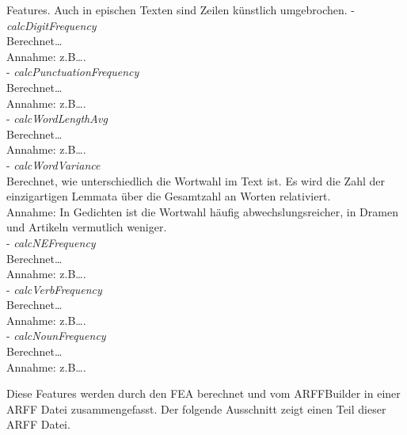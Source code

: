 \documentclass[]{article}
\begin{document}
Features. Auch in epischen Texten sind Zeilen künstlich umgebrochen. -
\emph{calcDigitFrequency}\\
Berechnet\ldots{}\\
Annahme: z.B\ldots{}.\\
- \emph{calcPunctuationFrequency}\\
Berechnet\ldots{}\\
Annahme: z.B\ldots{}.\\
- \emph{calcWordLengthAvg}\\
Berechnet\ldots{}\\
Annahme: z.B\ldots{}.\\
- \emph{calcWordVariance}\\
Berechnet, wie unterschiedlich die Wortwahl im Text ist. Es wird die
Zahl der einzigartigen Lemmata über die Gesamtzahl an Worten
relativiert.\\
Annahme: In Gedichten ist die Wortwahl häufig abwechslungsreicher, in
Dramen und Artikeln vermutlich weniger.\\
- \emph{calcNEFrequency}\\
Berechnet\ldots{}\\
Annahme: z.B\ldots{}.\\
- \emph{calcVerbFrequency}\\
Berechnet\ldots{}\\
Annahme: z.B\ldots{}.\\
- \emph{calcNounFrequency}\\
Berechnet\ldots{}\\
Annahme: z.B\ldots{}.

Diese Features werden durch den FEA berechnet und vom ARFFBuilder in
einer ARFF Datei zusammengefasst. Der folgende Ausschnitt zeigt einen
Teil dieser ARFF Datei.
\end{document}
